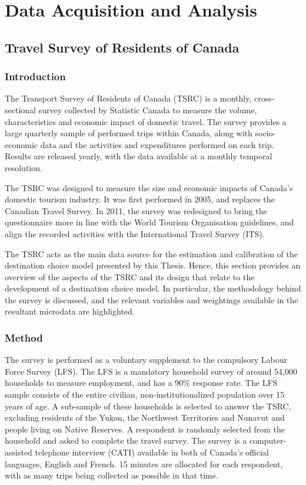 \chapter{Data Acquisition and Analysis}

\section{Travel Survey of Residents of Canada}

\subsection{Introduction}
The Transport Survey of Residents of Canada (TSRC) is a monthly, cross-sectional survey collected by Statistic Canada to measure the volume, characteristics and economic impact of domestic travel. The survey provides a large quarterly sample of performed trips within Canada, along with socio-economic data and the activities and expenditures performed on each trip. Results are released yearly, with the data available at a monthly temporal resolution. 

The TSRC was designed to measure the size and economic impacts of Canada's domestic tourism industry. It was first performed in 2005, and replaces the Canadian Travel Survey. In 2011, the survey was redesigned to bring the questionnaire more in line with the World Tourism Organisation guidelines, and align the recorded activities with the International Travel Survey (ITS). 

The TSRC acts as the main data source for the estimation and calibration of the destination choice model presented by this Thesis. Hence, this section provides an overview of the aspects of the TSRC and its design that relate to the development of a destination choice model. In particular, the methodology behind the survey is discussed, and the relevant variables and weightings available in the resultant microdata are highlighted.

\subsection{Method}
The survey is performed as a voluntary supplement to the compulsory Labour Force Survey (LFS). The LFS is a mandatory household survey of around 54,000 households to measure employment, and has a 90\% response rate. The LFS sample consists of the entire civilian, non-institutionalized population over 15 years of age. A sub-sample of these households is selected to answer the TSRC, excluding residents of the Yukon, the Northwest Territories and Nunavut and people living on Native Reserves. A respondent is randomly selected from the household and asked to complete the travel survey. The survey is a computer-assisted telephone interview (CATI) available in both of Canada's official languages, English and French. 15 minutes are allocated for each respondent, with as many trips being collected as possible in that time.

